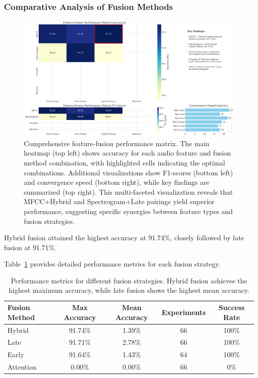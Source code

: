 \documentclass[12pt]{article}
\begin{document}
\subsubsection{Comparative Analysis of Fusion Methods}
\begin{figure}[h]
    \centering
    \includegraphics[width=0.95\linewidth]{Figures/comprehensive_fusion_matrix.png}
    \caption{Comprehensive feature-fusion performance matrix. The main heatmap (top left) shows accuracy for each audio feature and fusion method combination, with highlighted cells indicating the optimal combinations. Additional visualizations show F1-scores (bottom left) and convergence speed (bottom right), while key findings are summarized (top right). This multi-faceted visualization reveals that MFCC+Hybrid and Spectrogram+Late pairings yield superior performance, suggesting specific synergies between feature types and fusion strategies.}
    \label{fig:comprehensive_fusion}
\end{figure}

Hybrid fusion attained the highest accuracy at 91.74\%, closely followed by late fusion at 91.71\%.

Table~\ref{tab:fusion_method_performance} provides detailed performance metrics for each fusion strategy.

\begin{table}[h]
\centering
\begin{tabular}{|l|c|c|c|c|}
\hline
\textbf{Fusion Method} & \textbf{Max Accuracy} & \textbf{Mean Accuracy} & \textbf{Experiments} & \textbf{Success Rate} \\
\hline
Hybrid & 91.74\% & 1.39\% & 66 & 100\% \\
\hline
Late & 91.71\% & 2.78\% & 66 & 100\% \\
\hline
Early & 91.64\% & 1.43\% & 64 & 100\% \\
\hline
Attention & 0.00\% & 0.00\% & 66 & 0\% \\
\hline
\end{tabular}
\caption{Performance metrics for different fusion strategies. Hybrid fusion achieves the highest maximum accuracy, while late fusion shows the highest mean accuracy.}
\label{tab:fusion_method_performance}
\end{table}
\end{document}
